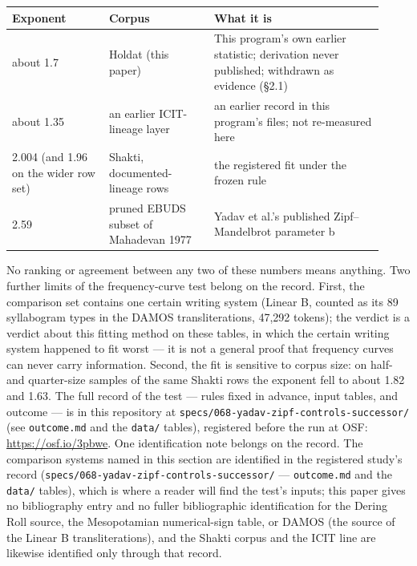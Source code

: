 \documentclass[11pt]{article}
\begin{document}
\begin{center}
\begin{tabular}{@{}p{0.24\linewidth} p{0.26\linewidth} p{0.42\linewidth}@{}}
\toprule
Exponent & Corpus & What it is \\
\midrule
about 1.7 & Holdat (this paper) & This program's own earlier statistic; derivation never published; withdrawn as evidence (§2.1) \\
about 1.35 & an earlier ICIT-lineage layer & an earlier record in this program's files; not re-measured here \\
2.004 (and 1.96 on the wider row set) & Shakti, documented-lineage rows & the registered fit under the frozen rule \\
2.59 & pruned EBUDS subset of Mahadevan 1977 & Yadav et al.'s published Zipf--Mandelbrot parameter b \\
\bottomrule
\end{tabular}
\end{center}

No ranking or agreement between any two of these numbers means anything. Two further limits of the frequency-curve test belong on the record. First, the comparison set contains one certain writing system (Linear B, counted as its 89 syllabogram types in the DAMOS transliterations, 47,292 tokens); the verdict is a verdict about this fitting method on these tables, in which the certain writing system happened to fit worst --- it is not a general proof that frequency curves can never carry information. Second, the fit is sensitive to corpus size: on half- and quarter-size samples of the same Shakti rows the exponent fell to about 1.82 and 1.63. The full record of the test --- rules fixed in advance, input tables, and outcome --- is in this repository at \texttt{specs/068-yadav-zipf-controls-successor/} (see \texttt{outcome.md} and the \texttt{data/} tables), registered before the run at OSF: \url{https://osf.io/3pbwe}. One identification note belongs on the record. The comparison systems named in this section are identified in the registered study's record (\texttt{specs/068-yadav-zipf-controls-successor/} --- \texttt{outcome.md} and the \texttt{data/} tables), which is where a reader will find the test's inputs; this paper gives no bibliography entry and no fuller bibliographic identification for the Dering Roll source, the Mesopotamian numerical-sign table, or DAMOS (the source of the Linear B transliterations), and the Shakti corpus and the ICIT line are likewise identified only through that record.
\end{document}

